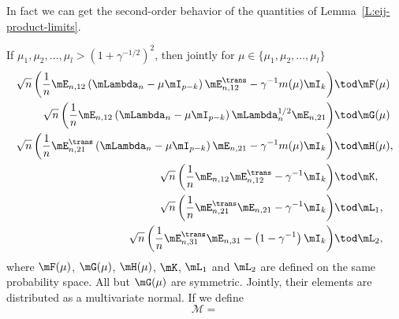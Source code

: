 In fact we can get the second-order behavior of the quantities of Lemma~\ref{L:eij-product-limits}.

\begin{lemma}\label{L:eij-product-scaled-limits}
    If $\mu_1, \mu_2, \ldots, \mu_l > \left( 1 + \gamma^{-1/2} \right)^2$, 
    then jointly for $\mu \in \{ \mu_1, \mu_2, \ldots, \mu_l \}$
    \begin{align*}
        \sqrt{n}
        \left(
            \frac{1}{n}
            \mE_{n,12}
            \left(
                \mLambda_n
                -
                \mu
                \mI_{p-k}
            \right)
            \mE_{n,12}^\trans
            -
            \gamma^{-1}
            m(\mu)
            \mI_k
        \right)
            &\tod \mF(\mu) \\
        \sqrt{n}
        \left(
            \frac{1}{n}
            \mE_{n,12}
            \left(
                \mLambda_n
                -
                \mu
                \mI_{p-k}
            \right)
            \mLambda_{n}^{1/2}
            \mE_{n,21}
        \right)
            &\tod \mG(\mu) \\
        \sqrt{n}
        \left(
            \frac{1}{n}
            \mE_{n,21}^\trans
            \left(
                \mLambda_n
                -
                \mu
                \mI_{p-k}
            \right)
            \mE_{n,21}
            -
            \gamma^{-1}
            m(\mu)
            \mI_k
        \right)
            &\tod \mH(\mu), \\
        \sqrt{n}
        \left(
            \frac{1}{n}
            \mE_{n,12} \mE_{n,12}^\trans
            -
            \gamma^{-1}
            \mI_k
        \right)
            &\tod \mK, \\
        \sqrt{n}
        \left(
            \frac{1}{n}
            \mE_{n,21}^\trans \mE_{n,21}
            -
            \gamma^{-1}
            \mI_k
        \right)
            &\tod \mL_1, \\
        \sqrt{n}
        \left(
            \frac{1}{n}
            \mE_{n,31}^\trans \mE_{n,31}
            -
            \left( 1 - \gamma^{-1} \right)
            \mI_k
        \right)
            &\tod \mL_2,
    \end{align*}
    where $\mF(\mu)$, $\mG(\mu)$, $\mH(\mu)$, $\mK$, $\mL_1$ and $\mL_2$ are 
    defined on the same probability space.  
    All but $\mG(\mu)$ are symmetric. Jointly, their elements are
    distributed as a multivariate normal.  If we define
    \[
        \mathcal{M}
        =
\]
\end{lemma}
